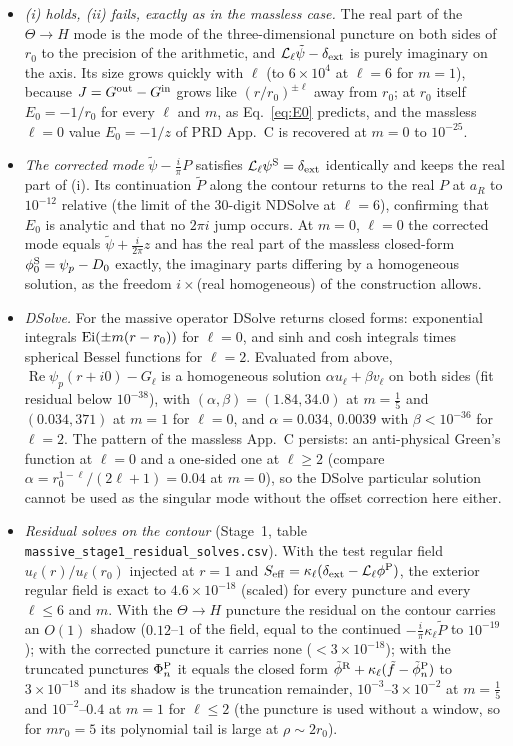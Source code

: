 \documentclass[11pt,a4paper]{article}
\renewcommand{\Re}{\operatorname{Re}}
\newcommand{\dext}{\delta_{\rm ext}}
\newcommand{\Lop}{\mathcal{L}_\ell}
\newcommand{\code}[1]{\texttt{#1}}
\newcommand{\PhiP}{\Phi^{\rm P}}
\begin{document}
\begin{itemize}[leftmargin=*]
\item \emph{(i) holds, (ii) fails, exactly as in the massless case.} The real part of the $\Theta\to H$ mode is the mode of the three-dimensional puncture on both sides of $r_0$ to the precision of the arithmetic, and $\Lop\tilde\psi-\dext$ is purely imaginary on the axis. Its size grows quickly with $\ell$ (to $6\times10^4$ at $\ell=6$ for $m=1$), because $J=G^{\rm out}-G^{\rm in}$ grows like $(r/r_0)^{\pm\ell}$ away from $r_0$; at $r_0$ itself $E_0=-1/r_0$ for every $\ell$ and $m$, as Eq.~\eqref{eq:E0} predicts, and the massless $\ell=0$ value $E_0=-1/z$ of PRD App.~C is recovered at $m=0$ to $10^{-25}$.
\item \emph{The corrected mode} $\tilde\psi-\tfrac i\pi P$ satisfies $\Lop\psi^{\rm S}=\dext$ identically and keeps the real part of (i). Its continuation $\tilde P$ along the contour returns to the real $P$ at $a_R$ to $10^{-12}$ relative (the limit of the 30-digit NDSolve at $\ell=6$), confirming that $E_0$ is analytic and that no $2\pi i$ jump occurs. At $m=0$, $\ell=0$ the corrected mode equals $\tilde\psi+\tfrac{i}{2\pi}z$ and has the real part of the massless closed-form $\phi^{\rm S}_0=\psi_p-D_0$ exactly, the imaginary parts differing by a homogeneous solution, as the freedom $i\times$(real homogeneous) of the construction allows.
\item \emph{DSolve.} For the massive operator DSolve returns closed forms: exponential integrals ${\rm Ei}(\pm m(r-r_0))$ for $\ell=0$, and sinh and cosh in\-te\-grals times spherical Bessel functions for $\ell=2$. Evaluated from above, $\Re\psi_p(r+i0)-G_\ell$ is a homogeneous solution $\alpha u_\ell+\beta v_\ell$ on both sides (fit residual below $10^{-38}$), with $(\alpha,\beta)=(1.84,34.0)$ at $m=\tfrac15$ and $(0.034,371)$ at $m=1$ for $\ell=0$, and $\alpha=0.034$, $0.0039$ with $\beta<10^{-36}$ for $\ell=2$. The pattern of the massless App.~C persists: an anti-physical Green's function at $\ell=0$ and a one-sided one at $\ell\ge2$ (compare $\alpha=r_0^{1-\ell}/(2\ell+1)=0.04$ at $m=0$), so the DSolve particular solution cannot be used as the singular mode without the offset correction here either.
\item \emph{Residual solves on the contour} (Stage~1, table \code{massive\_stage1\_\allowbreak residual\_\allowbreak solves.csv}). With the test regular field $u_\ell(r)/u_\ell(r_0)$ injected at $r=1$ and $S_{\rm eff}=\kappa_\ell(\dext-\Lop\phi^{\rm P})$, the exterior regular field is exact to $4.6\times10^{-18}$ (scaled) for every puncture and every $\ell\le6$ and $m$. With the $\Theta\to H$ puncture the residual on the contour carries an $O(1)$ shadow ($0.12$--$1$ of the field, equal to the continued $-\tfrac i\pi\kappa_\ell\tilde P$ to $10^{-19}$); with the corrected puncture it carries none ($<3\times10^{-18}$); with the truncated punctures $\PhiP_n$ it equals the closed form $\tilde\phi^{\rm R}+\kappa_\ell(\tilde f-\tilde\phi^{\rm P}_n)$ to $3\times10^{-18}$ and its shadow is the truncation remainder, $10^{-3}$--$3\times10^{-2}$ at $m=\tfrac15$ and $10^{-2}$--$0.4$ at $m=1$ for $\ell\le2$ (the puncture is used without a window, so for $mr_0=5$ its polynomial tail is large at $\rho\sim2r_0$).

\end{itemize}
\end{document}
